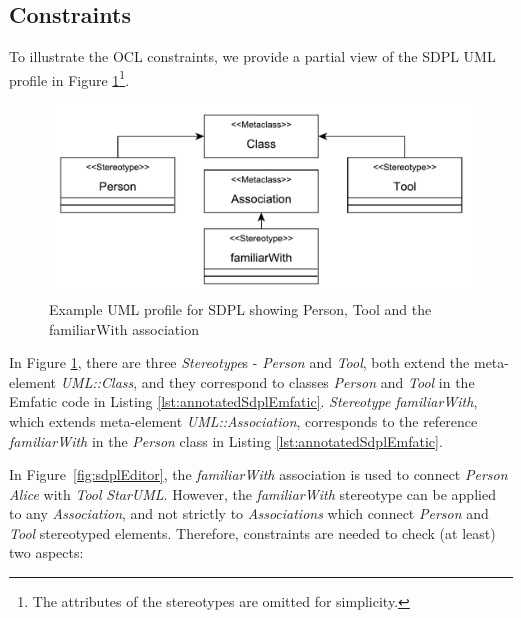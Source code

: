 \subsection{Constraints}
\label{sec:constraints}

To illustrate the OCL constraints, we provide a partial view of the SDPL UML profile in Figure \ref{fig:sample_profile}\footnote{The attributes of the stereotypes are omitted for simplicity.}.

\begin{figure}[ht!]
	\centering
	\includegraphics[width=1\textwidth]{diagrams/example_profile}
	\caption[]{Example UML profile for SDPL showing Person, Tool and the familiarWith association}
	\label{fig:sample_profile}
\end{figure}

In Figure \ref{fig:sample_profile}, there are three \emph{Stereotype}s - \emph{Person} and \emph{Tool}, both extend the meta-element \emph{UML::Class}, and they correspond to classes \emph{Person} and \emph{Tool} in the Emfatic code in Listing \ref{lst:annotatedSdplEmfatic}. 
\emph{Stereotype} \emph{familiarWith}, which extends meta-element \emph{UML::Association}, corresponds to the reference \emph{familiarWith} in the \emph{Person} class in Listing \ref{lst:annotatedSdplEmfatic}.

%

In Figure~\ref{fig:sdplEditor}, the \textit{familiarWith} association is used to connect \textit{Person} \emph{Alice} with \textit{Tool} \emph{StarUML}. 
However, the \emph{familiarWith} stereotype can be applied to any \emph{Association}, and not strictly to \emph{Associations} which connect \emph{Person} and \emph{Tool} stereotyped elements. 
Therefore, constraints are needed to check (at least) two aspects:


